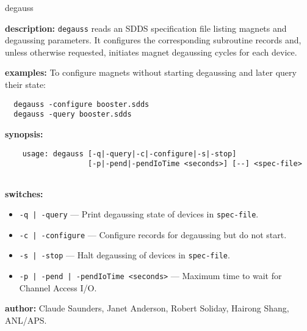 \begin{sddsprog}{degauss}
\item \textbf{description:}
\verb+degauss+ reads an SDDS specification file listing magnets and degaussing parameters.
It configures the corresponding subroutine records and, unless otherwise requested, initiates
magnet degaussing cycles for each device.
\item \textbf{examples:}
To configure magnets without starting degaussing and later query their state:
\begin{verbatim}
  degauss -configure booster.sdds
  degauss -query booster.sdds
\end{verbatim}
\item \textbf{synopsis:}
  \begin{verbatim}
    usage: degauss [-q|-query|-c|-configure|-s|-stop]
                   [-p|-pend|-pendIoTime <seconds>] [--] <spec-file>
  
\end{verbatim}
\item \textbf{switches:}
\begin{itemize}
  \item {\tt -q\,|\,-query} --- Print degaussing state of devices in {\tt spec-file}.
  \item {\tt -c\,|\,-configure} --- Configure records for degaussing but do not start.
  \item {\tt -s\,|\,-stop} --- Halt degaussing of devices in {\tt spec-file}.
  \item {\tt -p\,|\,-pend\,|\,-pendIoTime <seconds>} --- Maximum time to wait for Channel Access I/O.
\end{itemize}
\item \textbf{author:} Claude Saunders, Janet Anderson, Robert Soliday, Hairong Shang, ANL/APS.
\end{sddsprog}
